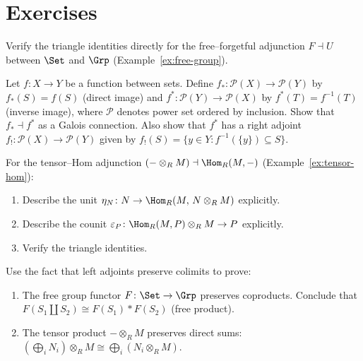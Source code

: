 \section{Exercises}\label{sec:exercises-ch4}

\begin{exercise}\label{exer:adj-check-triangle}
Verify the triangle identities directly for the free--forgetful adjunction
$F\dashv U$ between $\Set$ and $\Grp$ (Example~\ref{ex:free-group}).
\end{exercise}

\begin{exercise}\label{exer:adj-poset}
Let $f\colon X\to Y$ be a function between sets.  Define
$f_*\colon\mathcal{P}(X)\to\mathcal{P}(Y)$ by $f_*(S)=f(S)$
(direct image) and $f^*\colon\mathcal{P}(Y)\to\mathcal{P}(X)$
by $f^*(T)=f^{-1}(T)$ (inverse image), where $\mathcal{P}$ denotes
power set ordered by inclusion.
Show that $f_*\dashv f^*$ as a Galois connection.
Also show that $f^*$ has a right adjoint $f_!\colon\mathcal{P}(X)\to\mathcal{P}(Y)$
given by $f_!(S) = \{y\in Y : f^{-1}(\{y\})\subseteq S\}$.
\end{exercise}

\begin{exercise}\label{exer:adj-tensor-hom-triangle}
For the tensor--Hom adjunction $(-\otimes_R M)\dashv\Hom_R(M,-)$
(Example~\ref{ex:tensor-hom}):
\begin{enumerate}[label=(\alph*)]
\item Describe the unit $\eta_N\colon N\to\Hom_R(M,\,N\otimes_R M)$
    explicitly.
\item Describe the counit
    $\varepsilon_P\colon\Hom_R(M,P)\otimes_R M\to P$ explicitly.
\item Verify the triangle identities.
\end{enumerate}
\end{exercise}

\begin{exercise}\label{exer:ladj-preserves-colim-examples}
Use the fact that left adjoints preserve colimits to prove:
\begin{enumerate}[label=(\alph*)]
\item The free group functor $F\colon\Set\to\Grp$ preserves coproducts.
    Conclude that $F(S_1\amalg S_2)\cong F(S_1)*F(S_2)$ (free product).
\item The tensor product $-\otimes_R M$ preserves direct sums:
    $(\bigoplus_i N_i)\otimes_R M \cong \bigoplus_i(N_i\otimes_R M)$.
\end{enumerate}
\end{exercise}

